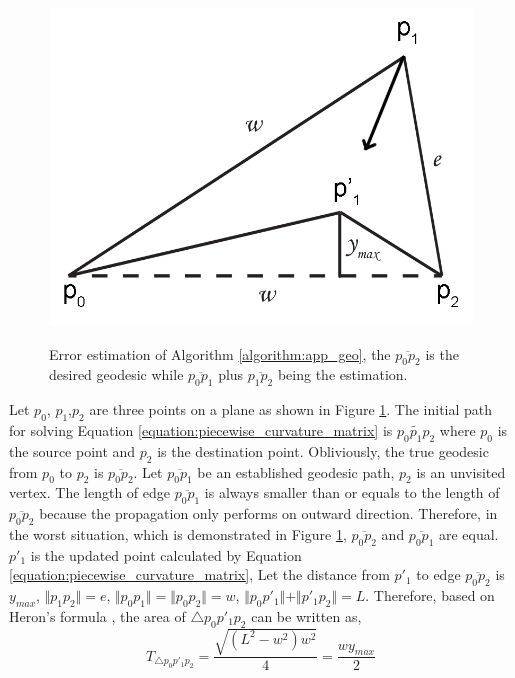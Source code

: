 \begin{figure}[H]
	\centering
	\includegraphics[width=0.9\columnwidth]{../images/geodesic_image/error_demo_triangle}\\
    \caption[Error estimation of Algorithm \ref{algorithm:app_geo}]{Error estimation of Algorithm \ref{algorithm:app_geo}, the $\overline{p_{0}p_{2}}$ is the desired geodesic while $\overline{p_{0}p_{1}}$ plus $\overline{p_{1}p_{2}}$ being the estimation.}
    \label{figure:geo_error}
\end{figure} 

Let $p_{0}$, $p_{1}$,$p_{2}$ are three points on a plane as shown in Figure \ref{figure:geo_error}. The initial path for solving Equation \ref{equation:piecewise_curvature_matrix} is $\widetilde{p_{0}p_{1}p_{2}}$ where $p_{0}$ is the source point and $p_{2}$ is the destination point. Obliviously, the true geodesic from $p_{0}$ to $p_{2}$ is $\overline{p_{0}p_{2}}$. Let $\overline{p_{0}p_{1}}$ be an established geodesic path, $p_{2}$ is an unvisited vertex. The length of edge $\overline{p_{0}p_{1}}$ is always smaller than or equals to the length of $\overline{p_{0}p_{2}}$ because the propagation only performs on outward direction. Therefore, in the worst situation, which is demonstrated in Figure \ref{figure:geo_error}, $\overline{p_{0}p_{2}}$ and $\overline{p_{0}p_{1}}$ are equal. $p'_{1}$ is the updated point calculated by Equation \ref{equation:piecewise_curvature_matrix}, Let the distance from $p'_{1}$ to edge $\overline{p_{0}p_{2}}$ is $y_{max}$, $\Vert{p_{1}p_{2}}\Vert = e$, $\Vert{p_{0}p_{1}}\Vert = \Vert{p_{0}p_{2}}\Vert = w$, $\Vert{p_{0}p'_{1}}\Vert + \Vert{p'_{1}p_{2}}\Vert = L$. Therefore, based on Heron's formula , the area of $\bigtriangleup p_{0}p'_{1}p_{2}$ can be written as,
\begin{equation}
T_{\bigtriangleup p_{0}p'_{1}p_{2}} =  \frac{\sqrt{(L^{2}-w^{2})w^{2}}}{4} = \frac{wy_{max}}{2}
\end{equation}

